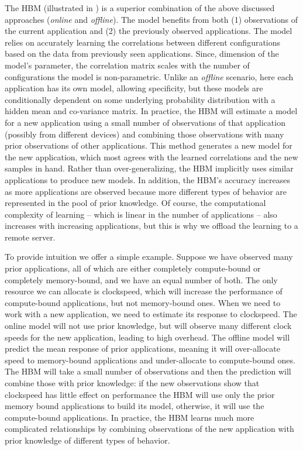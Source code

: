 The HBM (illustrated in ) is a superior combination of the
above discussed approaches (\emph{online} and \emph{offline}). The
model benefits from both (1) observations of the current application
and (2) the previously observed applications.  The model relies on
accurately learning the correlations between different configurations
based on the data from previously seen applications. Since, dimension
of the model's parameter, the correlation matrix scales with the
number of configurations the model is non-parametric.  Unlike an
\emph{offline} scenario, here each application has its own model,
allowing specificity, but these models are conditionally dependent on
some underlying probability distribution with a hidden mean and
co-variance matrix. In practice, the HBM will estimate a model for a
new application using a small number of observations of that
application (possibly from different devices) and combining those
observations with many prior observations of other applications. This
method generates a new model for the new application, which most
agrees with the learned correlations and the new samples in hand.
Rather than over-generalizing, the HBM implicitly uses similar
applications to produce new models.  In addition, the HBM's accuracy
increases as more applications are observed because more different
types of behavior are represented in the pool of prior knowledge.  Of
course, the computational complexity of learning -- which is linear in
the number of applications -- also increases with increasing
applications, but this is why we offload the learning to a remote
server.

To provide intuition we offer a simple example.  Suppose we have
observed many prior applications, all of which are either completely
compute-bound or completely memory-bound, and we have an equal number
of both.  The only resource we can allocate is clockspeed, which will
increase the performance of compute-bound applications, but not
memory-bound ones.  When we need to work with a new application, we
need to estimate its response to clockspeed.  The online model will
not use prior knowledge, but will observe many different clock speeds
for the new application, leading to high overhead.  The offline model
will predict the mean response of prior applications, meaning it will
over-allocate speed to memory-bound applications and under-allocate to
compute-bound ones.  The HBM will take a small number of observations
and then the prediction will combine those with prior knowledge: if
the new observations show that clockspeed has little effect on
performance the HBM will use only the prior memory bound applications
to build its model, otherwise, it will use the compute-bound
applications.  In practice, the HBM learns much more complicated
relationships by combining observations of the new application with
prior knowledge of different types of behavior.




